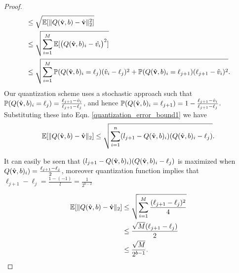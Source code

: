 \documentclass[aoas,preprint]{imsart}
\numberwithin{equation}{section}
\theoremstyle{plain}
\begin{document}
{\begin{proof}
\begin{equation}
\begin{split}
    &\leq \sqrt{\mathbb{E}[\| Q(\hat{\bf v}, b) - \hat{\bf v}\|^2_2]}\\
    &\leq \sqrt{\sum_{i=1}^{M} \mathbb{E}[\big (Q(\hat{\bf v}, b)_i -\hat{v_i}\big)^2]}\\
    &\leq \sqrt{\sum_{i=1}^{M} \mathbb{P}(Q(\hat{\bf v}, b)_i = \ell_j)(\hat{v}_i-\ell_j)^2 + \mathbb{P}(Q(\hat{\bf v}, b)_i = \ell_{j+1})(\ell_{j+1}-\hat{v}_i)^2}.
\end{split}
\end{equation}
Our quantization scheme uses a stochastic approach such that $\mathbb{P}(Q(\hat{\bf v}, b)_i = \ell_j)=\frac{\ell_{j+1}-\hat{v}_i}{\ell_{j+1}-\ell_{j}}$, and hence $\mathbb{P}(Q(\hat{\bf v}, b)_i = \ell_{j+1})=1-\frac{\ell_{j+1}-\hat{v}_i}{\ell_{j+1}-\ell_{j}}$. Substituting these into Eqn. \ref{quantization_error_bound1} we have
\begin{equation}\label{quantization_error_sub}
\begin{split}
    \mathbb{E}[\| Q(\hat{\bf v}, b) - \hat{\bf v}\|_2] \leq \sqrt{\sum_{i=1}^{n} (l_{j+1}-Q(\hat{\bf v}, b)_i)(Q(\hat{\bf v}, b)_i-\ell_j)}.
\end{split}
\end{equation}

It can easily be seen that $(l_{j+1}-Q(\hat{\bf v}, b)_i)(Q(\hat{\bf v}, b)_i-\ell_j)$ is maximized when $Q(\hat{\bf v}, b)_i) =  \frac{\ell_{j+1}-\ell_j}{2}$, moreover quantization function implies that $\ell_{j+1}-\ell_j = \frac{1-(-1)}{l} = \frac{1}{2^{b-2}}$


\begin{equation}\label{quantization_error}
\begin{split}
    \mathbb{E}[\| Q(\hat{\bf v}, b) - \hat{\bf v}\|_2] &\leq \sqrt{\sum_{i=1}^{M} \frac{(\ell_{j+1}-\ell_j)^2}{4}}\\
    &\leq \frac{\sqrt{M}(\ell_{j+1}-\ell_j)}{2}\\
    &\leq \frac{\sqrt{M}}{2^{b-1}}.
\end{split}
\end{equation}
\end{proof}



}
\end{document}
